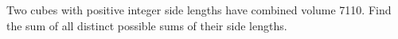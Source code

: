 Two cubes with positive integer side lengths have combined volume 7110. Find the sum of all distinct possible sums of their side lengths.
